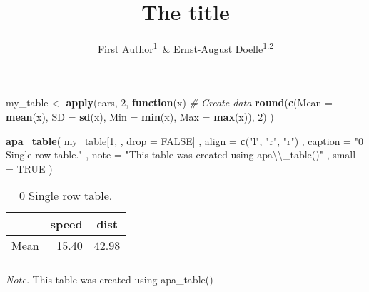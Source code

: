\documentclass[english,man]{apa6}
\title{The title}
\author{First Author\textsuperscript{1}~\& Ernst-August Doelle\textsuperscript{1,2}}
\affiliation{
    \vspace{0.5cm}
          \textsuperscript{1} Wilhelm-Wundt-University\\
          \textsuperscript{2} Konstanz Business School  }
\newenvironment{Shaded}{\begin{snugshade}}{\end{snugshade}}
\newcommand{\KeywordTok}[1]{\textcolor[rgb]{0.13,0.29,0.53}{\textbf{#1}}}
\newcommand{\DataTypeTok}[1]{\textcolor[rgb]{0.13,0.29,0.53}{#1}}
\newcommand{\DecValTok}[1]{\textcolor[rgb]{0.00,0.00,0.81}{#1}}
\newcommand{\CharTok}[1]{\textcolor[rgb]{0.31,0.60,0.02}{#1}}
\newcommand{\StringTok}[1]{\textcolor[rgb]{0.31,0.60,0.02}{#1}}
\newcommand{\CommentTok}[1]{\textcolor[rgb]{0.56,0.35,0.01}{\textit{#1}}}
\newcommand{\OtherTok}[1]{\textcolor[rgb]{0.56,0.35,0.01}{#1}}
\newcommand{\ControlFlowTok}[1]{\textcolor[rgb]{0.13,0.29,0.53}{\textbf{#1}}}
\newcommand{\NormalTok}[1]{#1}
\theoremstyle{definition}
\theoremstyle{definition}
\theoremstyle{definition}
\theoremstyle{remark}
\begin{document}
\maketitle

\setcounter{secnumdepth}{0}



\begin{Shaded}
\begin{Highlighting}[]
\NormalTok{my_table <-}\StringTok{ }\KeywordTok{apply}\NormalTok{(cars, }\DecValTok{2}\NormalTok{, }\ControlFlowTok{function}\NormalTok{(x) }\CommentTok{# Create data}
  \KeywordTok{round}\NormalTok{(}\KeywordTok{c}\NormalTok{(}\DataTypeTok{Mean =} \KeywordTok{mean}\NormalTok{(x), }\DataTypeTok{SD =} \KeywordTok{sd}\NormalTok{(x), }\DataTypeTok{Min =} \KeywordTok{min}\NormalTok{(x), }\DataTypeTok{Max =} \KeywordTok{max}\NormalTok{(x)), }\DecValTok{2}\NormalTok{)}
\NormalTok{)}

\KeywordTok{apa_table}\NormalTok{(}
\NormalTok{  my_table[}\DecValTok{1}\NormalTok{, , }\DataTypeTok{drop =} \OtherTok{FALSE}\NormalTok{]}
\NormalTok{  , }\DataTypeTok{align =} \KeywordTok{c}\NormalTok{(}\StringTok{"l"}\NormalTok{, }\StringTok{"r"}\NormalTok{, }\StringTok{"r"}\NormalTok{)}
\NormalTok{  , }\DataTypeTok{caption =} \StringTok{"0 Single row table."}
\NormalTok{  , }\DataTypeTok{note =} \StringTok{"This table was created using apa}\CharTok{\textbackslash{}\textbackslash{}}\StringTok{_table()"}
\NormalTok{  , }\DataTypeTok{small =} \OtherTok{TRUE}
\NormalTok{)}
\end{Highlighting}
\end{Shaded}

\begin{table}[tbp]
\begin{center}
\begin{threeparttable}
\caption{\label{tab:unnamed-chunk-2}0 Single row table.}
\small{
\begin{tabular}{lrr}
\toprule
 & \multicolumn{1}{c}{speed} & \multicolumn{1}{c}{dist}\\
\midrule
Mean & 15.40 & 42.98\\
\bottomrule
\addlinespace
\end{tabular}
}
\begin{tablenotes}[para]
\textit{Note.} This table was created using apa\_table()
\end{tablenotes}
\end{threeparttable}
\end{center}
\end{table}
\end{document}
